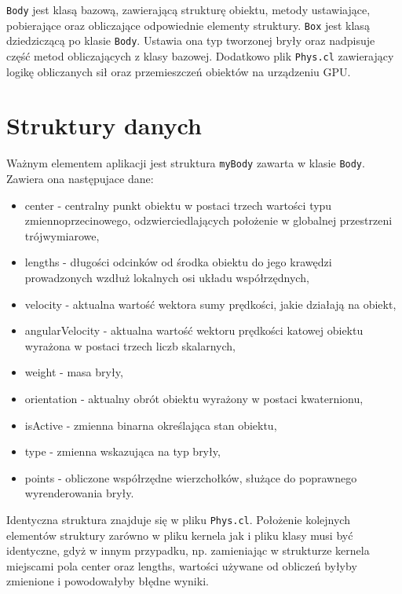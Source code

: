 \verb$Body$ jest klasą bazową, zawierającą strukturę obiektu, metody ustawiające, pobierające oraz obliczające odpowiednie elementy struktury.
\verb$Box$ jest klasą dziedziczącą po klasie \verb$Body$. Ustawia ona typ tworzonej bryły oraz nadpisuje część metod obliczających z klasy bazowej.
Dodatkowo plik \verb$Phys.cl$ zawierający logikę obliczanych sił oraz przemieszczeń obiektów na urządzeniu GPU.

\section{Struktury danych}
Ważnym elementem aplikacji jest struktura \verb$myBody$ zawarta w klasie \verb$Body$. Zawiera ona następujace dane:
\begin{itemize}
\item center -  centralny punkt obiektu w postaci trzech wartości typu zmiennoprzecinowego, odzwierciedlających położenie w globalnej przestrzeni trójwymiarowe,
\item lengths - długości odcinków od środka obiektu do jego krawędzi prowadzonych wzdłuż lokalnych osi układu współrzędnych,
\item velocity - aktualna wartość wektora sumy prędkości, jakie działają na obiekt,
\item angularVelocity - aktualna wartość wektoru prędkości katowej obiektu wyrażona w postaci trzech liczb skalarnych,
\item weight - masa bryły,
\item orientation - aktualny obrót obiektu wyrażony w postaci kwaternionu,
\item isActive - zmienna binarna określająca stan obiektu,
\item type - zmienna wskazująca na typ bryły,
\item points - obliczone współrzędne wierzchołków, służące do poprawnego wyrenderowania bryły.
\end{itemize}
Identyczna struktura znajduje się w pliku \verb$Phys.cl$. Położenie kolejnych elementów struktury zarówno w pliku kernela jak i pliku klasy musi być identyczne, gdyż w innym przypadku, np. zamieniając w strukturze kernela miejscami pola center oraz lengths, wartości używane od obliczeń byłyby zmienione i powodowałyby błędne wyniki.

